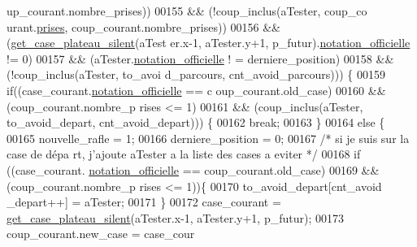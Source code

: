\begin{DoxyCode}
      up\_courant.nombre\_prises))
00155                                                 && (!coup\_inclus(aTester, coup\_co
      urant.\hyperlink{structcoup_ae19b3a66d3f4e66b8f69a38e4005f44a}{prises}, coup\_courant.nombre\_prises))
00156                                                 && (\hyperlink{plateau_8h_a60a8f706865d0ae9087f8d65d4667655}{get_case_plateau_silent}(aTest
      er.x-1, aTester.y+1, p\_futur).\hyperlink{structcase__plateau_ad510581b324604a9cf685cbb769a421a}{notation_officielle} != 0)
00157                                                 && (aTester.\hyperlink{structcase__plateau_ad510581b324604a9cf685cbb769a421a}{notation_officielle} !
      = derniere\_position)
00158                                                 && (!coup\_inclus(aTester, to\_avoi
      d\_parcours, cnt\_avoid\_parcours))) \{
00159                                         \textcolor{keywordflow}{if}((case\_courant.\hyperlink{structcase__plateau_ad510581b324604a9cf685cbb769a421a}{notation_officielle} == c
      oup\_courant.old\_case)
00160                                                         && (coup\_courant.nombre\_p
      rises <= 1)
00161                                                         && (coup\_inclus(aTester, 
      to\_avoid\_depart, cnt\_avoid\_depart))) \{
00162                                                 \textcolor{keywordflow}{break};
00163                                         \}
00164                                         \textcolor{keywordflow}{else} \{
00165                                                 nouvelle\_rafle = 1;
00166                                                 derniere\_position = 0;
00167                                                 \textcolor{comment}{/* si je suis sur la case de dépa
      rt, j'ajoute aTester a la liste des cases a eviter */}
00168                                                 \textcolor{keywordflow}{if} ((case\_courant.
      \hyperlink{structcase__plateau_ad510581b324604a9cf685cbb769a421a}{notation_officielle} == coup\_courant.old\_case)
00169                                                         && (coup\_courant.nombre\_p
      rises <= 1))\{
00170                                                         to\_avoid\_depart[cnt\_avoid
      \_depart++] = aTester;
00171                                                 \}
00172                                                 case\_courant = 
      \hyperlink{plateau_8h_a60a8f706865d0ae9087f8d65d4667655}{get_case_plateau_silent}(aTester.x-1, aTester.y+1, p\_futur);
00173                                                 coup\_courant.new\_case = case\_cour

\end{DoxyCode}
